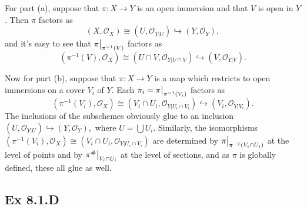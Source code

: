\documentclass{article}
\newcommand\restr[2]{{%
  \left.\kern-\nulldelimiterspace %
  #1 %
  \vphantom{\big|} %
  \right|_{#2} %
  }}
\theoremstyle{definition}
\begin{document}
For part (a), suppose that $\pi : X \to Y$ is an open immersion and that $V$ is
open in $Y$. Then $\pi$ factors as
\[
	(X, \mathcal{O}_X) \cong (U, \mathcal{O}_{Y \vert U}) \hookrightarrow (Y, \mathcal{O}_Y),
\]
and it's easy to see that $\restr{\pi}{\pi^{-1}(V)}$ factors as
\[
	(\pi^{-1}(V), \mathcal{O}_X) \cong (U \cap V, \mathcal{O}_{Y \vert U \cap
		V}) \hookrightarrow (V, \mathcal{O}_{Y \vert V}).
\]

Now for part (b), suppose that $\pi : X \to Y$ is a map which restricts to open
immersions on a cover $V_i$ of $Y$. Each $\pi_i = \restr{\pi}{\pi^{-1}(V_i)}$
factors as
\[
	(\pi^{-1}(V_i), \mathcal{O}_X) \cong (V_i \cap U_i, \mathcal{O}_{Y \vert
		U_i \cap V_i}) \hookrightarrow (V_i, \mathcal{O}_{Y \vert V_i}).
\]
The inclusions of the subschemes obviously glue to an inclusion $(U,
	\mathcal{O}_{Y \vert U}) \hookrightarrow (Y, \mathcal{O}_{Y}),$ where $U =
	\bigcup U_i$. Similarly, the isomorphisms $(\pi^{-1}(V_i), \mathcal{O}_X) \cong
	(V_i \cap U_i, \mathcal{O}_{Y \vert U_i \cap V_i})$ are determined by
$\restr{\pi}{\pi^{-1}(V_i \cap U_i)}$ at the level of points and by
$\restr{\pi^{\#}}{V_i \cap U_i}$ at the level of sections, and as $\pi$ is
globally defined, these all glue as well.

\subsection*{Ex 8.1.D}
\end{document}
